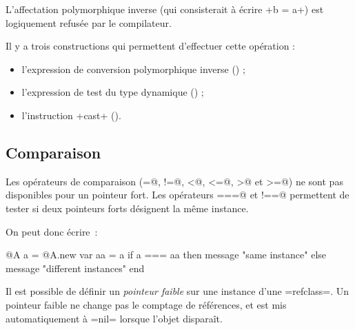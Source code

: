 L'affectation polymorphique inverse (qui consisterait à écrire \ggs+b = a+) est logiquement refusée par le compilateur.

Il y a trois constructions qui permettent d'effectuer cette opération :
\begin{itemize}
  \item l'expression de conversion polymorphique inverse () ;
  \item l'expression de test du type dynamique () ;
  \item l'instruction \ggs+cast+ ().
\end{itemize}

%


\subsection{Comparaison}

Les opérateurs de comparaison (\ggs@=@, \ggs@!=@, \ggs@<@, \ggs@<=@, \ggs@>@ et \ggs@>=@) ne sont pas disponibles pour un pointeur fort. Les opérateurs \ggs@===@ et \ggs@!==@ permettent de tester si deux pointeurs forts désignent la même instance.


On peut donc écrire~:
\begin{galgas}
  @A a = @A.new
  var aa = a
  if a === aa then
    message "same instance\n"
  else
    message "different instances\n"
  end
\end{galgas}





Il est possible de définir un \emph{pointeur faible} sur une instance d'une \ggs=refclass=. Un pointeur faible ne change pas le comptage de références, et est mis automatiquement à \ggs=nil= lorsque l'objet disparaît.

